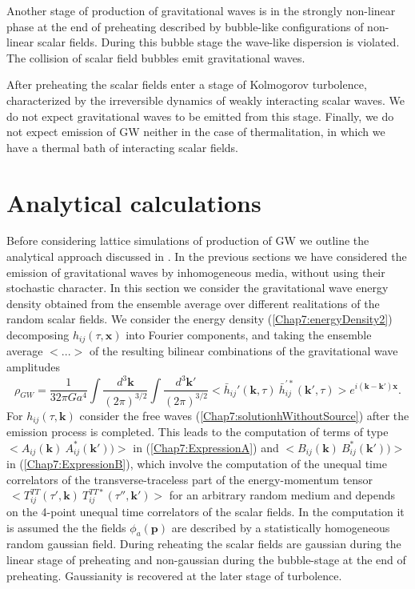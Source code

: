 \documentclass[11pt,a4paper,twoside]{book}
\begin{document}
 Another stage of production of gravitational waves is in the strongly non-linear phase at the end of preheating described by bubble-like configurations of non-linear scalar fields. During this bubble stage the wave-like dispersion is violated. The collision of scalar field bubbles emit gravitational waves.
 
 After preheating the scalar fields enter a stage of Kolmogorov turbolence, characterized by the irreversible dynamics of weakly interacting scalar waves. We do not expect gravitational waves to be emitted from this stage. Finally, we do not expect emission of  GW neither in the case of thermalitation, in which we have a thermal bath of interacting scalar fields.
 \section{Analytical calculations}
 Before considering lattice simulations of production of GW we outline the analytical approach discussed in \cite{Chap7:GreenMethod}. In the previous sections we have considered the emission of gravitational waves by inhomogeneous media, without using their stochastic character. In this section we consider the gravitational wave energy density obtained from the ensemble average over different realitations of the random scalar fields. We consider the energy density (\ref{Chap7:energyDensity2}) decomposing $ h_{ij}(\tau,\textbf{x}) $ into Fourier components, and taking the ensemble average  $ <...> $ of the resulting bilinear combinations of the gravitational wave amplitudes
 \begin{equation}
\label{Chap7:energyDensity3}
\rho_{GW}=\frac{1}{32\pi G a^{4}} \int \frac{d^{3} \textbf{k}}{(2\pi)^{3/2}} \int \frac{d^{3} \textbf{k}'}{(2\pi)^{3/2}} <\bar{h}_{ij}'(\textbf{k},\tau)\ \bar{h}^{'*}_{ij}(\textbf{k}',\tau)>e^{i(\textbf{k}-\textbf{k}')\textbf{x}}.
 \end{equation}
 For $ h_{ij}(\tau,\textbf{k}) $ consider the free waves (\ref{Chap7:solutionhWithoutSource}) after the emission process is completed. This leads to the computation of terms of type $ <A_{ij}(\textbf{k})\ A^{*}_{ij}(\textbf{k}'))> $ in (\ref{Chap7:ExpressionA}) and  $ <B_{ij}(\textbf{k})\ B^{*}_{ij}(\textbf{k}'))> $ in (\ref{Chap7:ExpressionB}),  which involve the computation of the unequal time correlators of the transverse-traceless  part of the energy-momentum tensor $\  <T^{TT}_{ij}(\tau',\textbf{k})\ T^{TT*}_{ij}(\tau'',\textbf{k}')> $ for an arbitrary random medium and depends on the 4-point unequal time correlators of the scalar fields. In the computation it is assumed the the fields $ \phi_{a}(\textbf{p}) $ are described by a statistically homogeneous random gaussian field. During reheating the scalar fields  are gaussian during the linear stage of preheating and non-gaussian during the bubble-stage at the end of preheating. Gaussianity is recovered at the later stage of turbolence.
 
\end{document}
